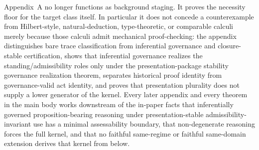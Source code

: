 \begin{remark}
Appendix~A no longer functions as background staging. It proves the necessity floor for the target class itself. In particular it does not concede a counterexample from Hilbert-style, natural-deduction, type-theoretic, or comparable calculi merely because those calculi admit mechanical proof-checking: the appendix distinguishes bare trace classification from inferential governance and closure-stable certification, shows that inferential governance realizes the standing/admissibility roles only under the presentation-package stability governance realization theorem, separates historical proof identity from governance-valid act identity, and proves that presentation plurality does not supply a lower generator of the kernel. Every later appendix and every theorem in the main body works downstream of the in-paper facts that inferentially governed proposition-bearing reasoning under presentation-stable admissibility-invariant use has a minimal assessability boundary, that non-degenerate reasoning forces the full kernel, and that no faithful same-regime or faithful same-domain extension derives that kernel from below.
\end{remark}

